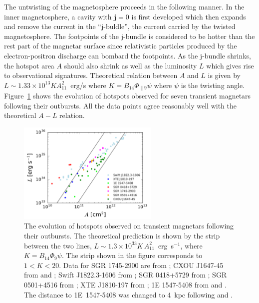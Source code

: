 The untwisting of the magnetosphere proceeds in the following manner.
In the inner magnetosphere, a cavity with $\boldsymbol{j}=0$ is first developed which then expands and remove the current in the ``j-buldle'', the current carried by the twisted magnetosphere.
The footpoints of the j-bundle is considered to be hotter than the rest part of the magnetar surface since relativistic particles produced by the electron-positron discharge can bombard the footpoints.
As the j-bundle shrinks, the hotspot area $A$ should also shrink as well as the luminosity $L$ which gives rise to observational signatures.
Theoretical relation between $A$ and $L$ is given by$L\sim 1.33\times 10^{13} K A_{11}^2$~erg/s where $K = B_{14}\Phi_{\parallel 9}\psi$ where $\psi$ is the twisting angle.
Figure~\ref{fig:hot-spot} shows the evolution of hotspots observed for seven transient magnetars following their outbursts.
All the data points agree reasonably well with the theoretical $A-L$ relation.
%
\begin{figure}[h]
  \centering
  \includegraphics[width=0.6\textwidth]{pics/intro/hot-spot.png}
  \caption[The evolution of hotspots observed on transient magnetars following their outbursts]{The evolution of hotspots observed on transient magnetars following their outbursts. 
The theoretical prediction is shown by the strip between the two lines, 
$L \sim 1.3 \times 10^{33} K\,A_{11}^2$~erg~s$^{-1}$, where $K=B_{14} \Phi_9 \psi$.
The strip shown in the figure corresponds to $1<K<20$. Data for SGR 1745-2900 are 
from \citet{2015MNRAS.449.2685C};
CXOU J1647-45 from \citet{2011ApJ...726...37W} and \citet{2013ApJ...763...82A};
Swift J1822.3-1606 from \citet{2012ApJ...754...27R};
SGR 0418+5729 from \citet{2010MNRAS.405.1787E};
SGR 0501+4516 from \citet{2009MNRAS.396.2419R};
XTE J1810-197 from \citet{2007Ap&SS.308...79G};
1E 1547-5408 from \citet{2008ApJ...676.1178H} and \citet{2010PASJ...62..475E}.
The distance to 1E~1547-5408 was changed to 4~kpc following  
\citet{2010ApJ...710..227T} and \citet{2007ApJ...667.1111G}.
}
  \label{fig:hot-spot}
\end{figure}
%

